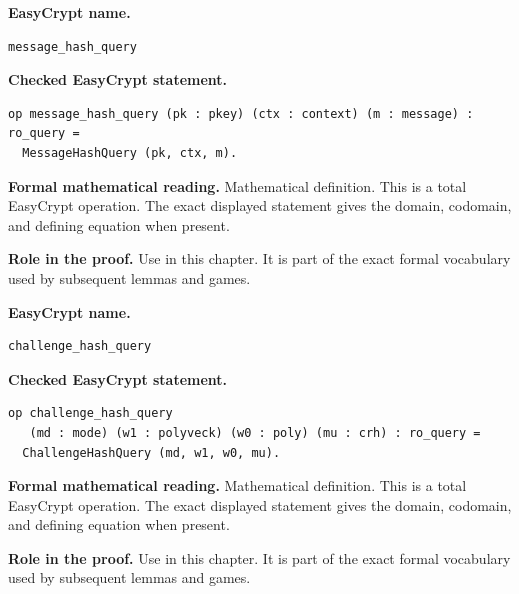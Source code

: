 \begin{formaldefinition}
\noindent\textbf{EasyCrypt name.}
\begin{lstlisting}[language=EasyCrypt,basicstyle=\ttfamily\scriptsize]
message_hash_query
\end{lstlisting}
\noindent\textbf{Checked EasyCrypt statement.}
\begin{lstlisting}[language=EasyCrypt,basicstyle=\ttfamily\scriptsize]
op message_hash_query (pk : pkey) (ctx : context) (m : message) : ro_query =
  MessageHashQuery (pk, ctx, m).
\end{lstlisting}
\noindent\textbf{Formal mathematical reading.}
Mathematical definition. This is a total EasyCrypt operation.  The exact displayed statement gives the domain, codomain, and defining equation when present.

\noindent\textbf{Role in the proof.}
Use in this chapter. It is part of the exact formal vocabulary used by subsequent lemmas and games.

\end{formaldefinition}

\begin{formaldefinition}
\noindent\textbf{EasyCrypt name.}
\begin{lstlisting}[language=EasyCrypt,basicstyle=\ttfamily\scriptsize]
challenge_hash_query
\end{lstlisting}
\noindent\textbf{Checked EasyCrypt statement.}
\begin{lstlisting}[language=EasyCrypt,basicstyle=\ttfamily\scriptsize]
op challenge_hash_query
   (md : mode) (w1 : polyveck) (w0 : poly) (mu : crh) : ro_query =
  ChallengeHashQuery (md, w1, w0, mu).
\end{lstlisting}
\noindent\textbf{Formal mathematical reading.}
Mathematical definition. This is a total EasyCrypt operation.  The exact displayed statement gives the domain, codomain, and defining equation when present.

\noindent\textbf{Role in the proof.}
Use in this chapter. It is part of the exact formal vocabulary used by subsequent lemmas and games.

\end{formaldefinition}

